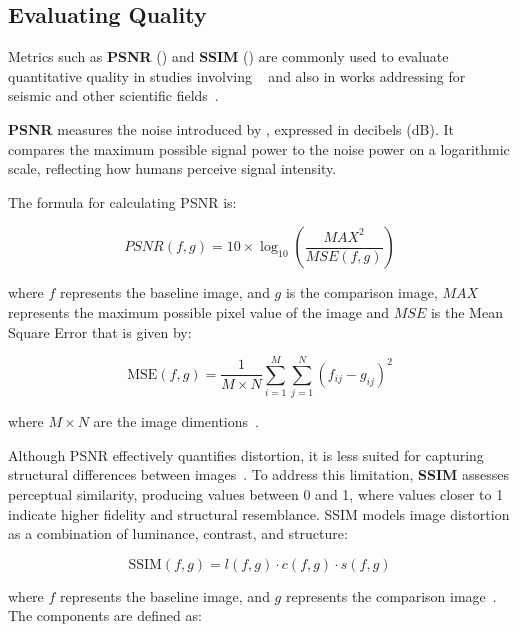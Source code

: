\documentclass[Ingles,Final]{ic-tese-v3}
\begin{document}
\subsection{Evaluating Quality}
\label{sec:eval_qual}

Metrics such as \textbf{PSNR} () and \textbf{SSIM} () are commonly used to evaluate quantitative quality in studies involving \compression~\cite{cuszp, fz} and also in works addressing \compression for seismic and other scientific fields~\cite{kukreja2020, boehm2016, wang2023}.

\textbf{PSNR} measures the noise introduced by \compression, expressed in decibels (dB). It compares the maximum possible signal power to the noise power on a logarithmic scale, reflecting how humans perceive signal intensity.

The formula for calculating PSNR is:

\begin{equation}
PSNR(f,g) = 10 \times \log_{10}\left(\frac{MAX^2}{MSE(f,g)}\right)
\label{eq:psnr}
\end{equation}

where $f$ represents the baseline image, and $g$ is the comparison image, $MAX$ represents the maximum possible pixel value of the image and $MSE$ is the Mean Square Error that is given by:

\begin{equation}
\text{MSE}(f, g) = \frac{1}{M \times N} \sum_{i=1}^{M} \sum_{j=1}^{N} \left(f_{ij} - g_{ij}\right)^2
\label{eq:mse}
\end{equation}

where $M \times N$ are the image dimentions~\cite{hore2010}.

Although PSNR effectively quantifies distortion, it is less suited for capturing structural differences between images~\cite{hore2010}. To address this limitation, \textbf{SSIM} assesses perceptual similarity, producing values between 0 and 1, where values closer to 1 indicate higher fidelity and structural resemblance. SSIM models image distortion as a combination of luminance, contrast, and structure:

\begin{equation}
\text{SSIM}(f, g) = l(f, g) \cdot c(f, g) \cdot s(f, g)
\label{eq:ssim}
\end{equation}

where $f$ represents the baseline image, and $g$ represents the comparison image~\cite{hore2010}. The components are defined as:
\end{document}
